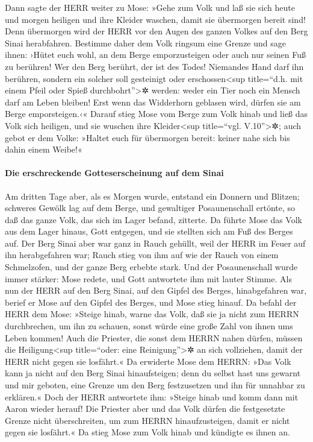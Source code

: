  Dann sagte der HERR weiter zu Mose: »Gehe zum Volk und
laß sie sich heute und morgen heiligen und ihre Kleider waschen,
 damit sie übermorgen bereit sind! Denn übermorgen wird
der HERR vor den Augen des ganzen Volkes auf den Berg Sinai herabfahren.
 Bestimme daher dem Volk ringsum eine Grenze und sage
ihnen: ›Hütet euch wohl, an dem Berge emporzusteigen oder auch nur
seinen Fuß zu berühren! Wer den Berg berührt, der ist des Todes!
 Niemandes Hand darf ihn berühren, sondern ein solcher
soll gesteinigt oder erschossen\textless sup title=``d.h. mit einem
Pfeil oder Spieß durchbohrt''\textgreater✲ werden: weder ein Tier noch
ein Mensch darf am Leben bleiben! Erst wenn das Widderhorn geblasen
wird, dürfen sie am Berge emporsteigen.‹«  Darauf stieg
Mose vom Berge zum Volk hinab und ließ das Volk sich heiligen, und sie
wuschen ihre Kleider\textless sup title=``vgl. V.10''\textgreater✲;
 auch gebot er dem Volke: »Haltet euch für übermorgen
bereit: keiner nahe sich bis dahin einem Weibe!«

\hypertarget{die-erschreckende-gotteserscheinung-auf-dem-sinai}{%
\paragraph{Die erschreckende Gotteserscheinung auf dem
Sinai}\label{die-erschreckende-gotteserscheinung-auf-dem-sinai}}

 Am dritten Tage aber, als es Morgen wurde, entstand ein
Donnern und Blitzen; schweres Gewölk lag auf dem Berge, und gewaltiger
Posaunenschall ertönte, so daß das ganze Volk, das sich im Lager befand,
zitterte.  Da führte Mose das Volk aus dem Lager hinaus,
Gott entgegen, und sie stellten sich am Fuß des Berges auf.
 Der Berg Sinai aber war ganz in Rauch gehüllt, weil der
HERR im Feuer auf ihn herabgefahren war; Rauch stieg von ihm auf wie der
Rauch von einem Schmelzofen, und der ganze Berg erbebte stark.
 Und der Posaunenschall wurde immer stärker: Mose redete,
und Gott antwortete ihm mit lauter Stimme.  Als nun der
HERR auf den Berg Sinai, auf den Gipfel des Berges, hinabgefahren war,
berief er Mose auf den Gipfel des Berges, und Mose stieg hinauf.
 Da befahl der HERR dem Mose: »Steige hinab, warne das
Volk, daß sie ja nicht zum HERRN durchbrechen, um ihn zu schauen, sonst
würde eine große Zahl von ihnen ums Leben kommen!  Auch
die Priester, die sonst dem HERRN nahen dürfen, müssen die
Heiligung\textless sup title=``oder: eine Reinigung''\textgreater✲ an
sich vollziehen, damit der HERR nicht gegen sie losfährt.«
 Da erwiderte Mose dem HERRN: »Das Volk kann ja nicht auf
den Berg Sinai hinaufsteigen; denn du selbst hast uns gewarnt und mir
geboten, eine Grenze um den Berg festzusetzen und ihn für unnahbar zu
erklären.«  Doch der HERR antwortete ihm: »Steige hinab
und komm dann mit Aaron wieder herauf! Die Priester aber und das Volk
dürfen die festgesetzte Grenze nicht überschreiten, um zum HERRN
hinaufzusteigen, damit er nicht gegen sie losfährt.«  Da
stieg Mose zum Volk hinab und kündigte es ihnen an.

